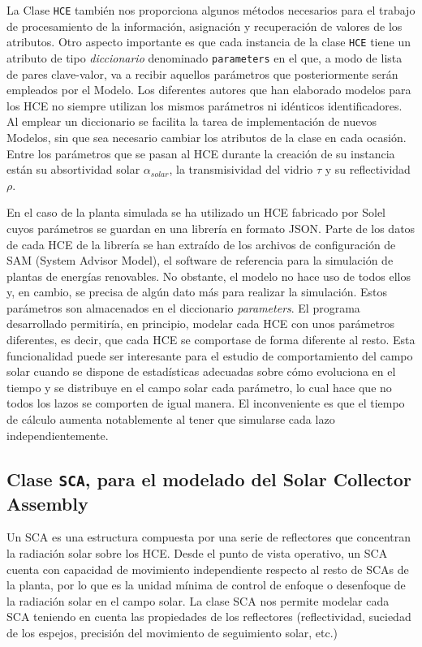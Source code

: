 La Clase \texttt{HCE} también nos proporciona algunos métodos necesarios para el trabajo de procesamiento de la información, asignación y recuperación de valores de los atributos. Otro aspecto importante es que cada instancia de la clase \texttt{HCE} tiene un
atributo de tipo \emph{diccionario} denominado \texttt{parameters}  en el que, a modo de lista de pares clave-valor, va a recibir aquellos parámetros que posteriormente serán empleados por el Modelo. Los diferentes autores que han elaborado modelos para los HCE no siempre utilizan los mismos parámetros ni idénticos identificadores. Al emplear un diccionario se facilita la tarea de implementación de nuevos Modelos, sin que sea necesario cambiar los atributos de la clase en cada ocasión. Entre los parámetros que se
pasan al HCE durante la creación de su instancia están su absortividad solar \(\alpha_{solar}\), la transmisividad del vidrio \(\tau\) y su reflectividad \(\rho\).

En el caso de la planta simulada se ha utilizado un HCE fabricado por Solel cuyos parámetros se guardan en una librería en formato JSON. Parte de los datos de cada HCE de la librería se han extraído de los archivos de configuración de SAM (System Advisor Model), el software de referencia para la simulación de plantas de energías renovables. No obstante, el modelo no hace uso de todos ellos y, en cambio, se precisa de algún dato más para realizar la simulación. Estos parámetros son
almacenados en el diccionario \emph{parameters}. El programa desarrollado permitiría, en principio, modelar cada HCE con unos parámetros diferentes, es decir, que cada HCE se comportase de forma diferente al resto. Esta funcionalidad puede ser interesante para el estudio de comportamiento del campo solar cuando se dispone de estadísticas adecuadas sobre cómo evoluciona en el tiempo y se distribuye en el campo solar cada parámetro, lo cual hace que no todos los lazos se comporten de igual manera. El inconveniente es que el tiempo de cálculo aumenta notablemente al tener que simularse cada lazo independientemente. 


\subsection{Clase \texttt{SCA}, para el modelado del Solar Collector Assembly}
\label{solar-collector-assembly-sca}

Un SCA es una estructura compuesta por una serie de reflectores que concentran la radiación solar sobre los HCE. Desde el punto de vista operativo, un SCA cuenta con capacidad de movimiento independiente respecto al resto de SCAs de la planta, por lo que es la unidad mínima de control de enfoque o desenfoque de la radiación solar en el campo solar. La clase SCA nos permite modelar cada SCA teniendo en cuenta las propiedades de los reflectores (reflectividad, suciedad de los espejos, precisión del movimiento de seguimiento solar, etc.)

